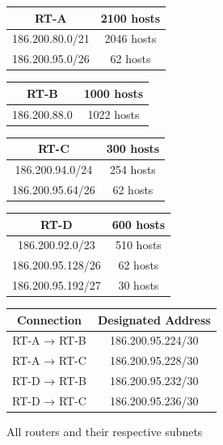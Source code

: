 \documentclass[a4paper, titlepage,12pt]{article}
\begin{document}
		\begin{figure}[h!]
		\begin{center}
			\begin{tabular}{|c|c|}
				\hline
				RT-A & 2100 hosts \\
				\hline
				186.200.80.0/21 & 2046 hosts \\
				\hline
				186.200.95.0/26 & 62 hosts \\
				\hline
			\end{tabular}
		\end{center}

		\begin{center}
			\begin{tabular}{|c|c|}
				\hline
				RT-B & 1000 hosts \\
				\hline
				186.200.88.0 & 1022 hosts \\
				\hline
			\end{tabular}
		\end{center}

		\begin{center}
			\begin{tabular}{|c|c|}
				\hline
				RT-C & 300 hosts \\
				\hline
				186.200.94.0/24 & 254 hosts \\
				\hline
				186.200.95.64/26 & 62 hosts \\
				\hline
			\end{tabular}
		\end{center}

		\begin{center}
			\begin{tabular}{|c|c|}
				\hline
				RT-D & 600 hosts \\
				\hline
				186.200.92.0/23 & 510 hosts \\
				\hline
				186.200.95.128/26 & 62 hosts \\
				\hline
				186.200.95.192/27 & 30 hosts \\
				\hline
			\end{tabular}
		\end{center}

		\begin{center}
			\begin{tabular}{|c|c|}
				\hline
				\textbf{Connection} & \textbf{Designated Address} \\
				\hline
				RT-A → RT-B & 186.200.95.224/30\\
				\hline
				RT-A → RT-C & 186.200.95.228/30\\
				\hline
				RT-D → RT-B & 186.200.95.232/30\\
				\hline
				RT-D → RT-C & 186.200.95.236/30\\
				\hline
			\end{tabular}
		\end{center}
		\caption{All routers and their respective subnets}
		\label{suggestedconfig}
	\end{figure}
\end{document}
